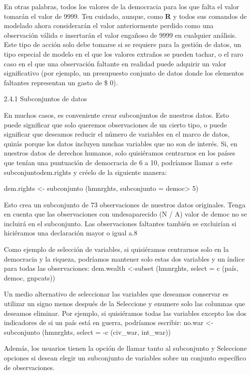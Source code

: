 \documentclass[
]{book}
\begin{document}
En otras palabras, todos los valores de la democracia para los que falta el valor tomarán el valor de 9999. Ten cuidado, aunque, como \textbf{R} y todos sus comandos de modelado ahora considerarán el valor anteriormente perdido como una observación válida e insertarán el valor engañoso de 9999 en cualquier análisis. Este tipo de acción solo debe tomarse si se requiere para la gestión de datos, un tipo especial de modelo en el que los valores extraños se pueden tachar, o el raro caso en el que una observación faltante en realidad puede adquirir un valor significativo (por ejemplo, un presupuesto conjunto de datos donde los elementos faltantes representan un gasto de \$ 0).

2.4.1 Subconjuntos de datos

En muchos casos, es conveniente crear subconjuntos de nuestros datos. Esto puede significar que solo queremos observaciones de un cierto tipo, o puede significar que deseamos reducir el número de variables en el marco de datos, quizás porque los datos incluyen muchas variables que no son de interés. Si, en nuestros datos de derechos humanos, solo quisiéramos centrarnos en los países que tenían una puntuación de democracia de 6 a 10, podríamos llamar a este subconjuntodem.rights y créelo de la siguiente manera:

dem.rights \textless- subconjunto (hmnrghts, subconjunto = democ\textgreater{} 5)

Esto crea un subconjunto de 73 observaciones de nuestros datos originales. Tenga en cuenta que las observaciones con undesaparecido (N / A) valor de democ no se incluirá en el subconjunto. Las observaciones faltantes también se excluirían si hiciéramos una declaración mayor o igual a.8

Como ejemplo de selección de variables, si quisiéramos centrarnos solo en la democracia y la riqueza, podríamos mantener solo estas dos variables y un índice para todas las observaciones:
dem.wealth \textless-subset (hmnrghts, select = c (país, democ, gnpcats))

Un medio alternativo de seleccionar las variables que deseamos conservar es utilizar un signo menos después de la Seleccione y enumere solo las columnas que deseamos eliminar. Por ejemplo, si quisiéramos todas las variables excepto los dos indicadores de si un país está en guerra, podríamos escribir:
no.war \textless- subconjunto (hmnrghts, select = -c (civ\_war, int\_war))

Además, los usuarios tienen la opción de llamar tanto al subconjunto y Seleccione opciones si desean elegir un subconjunto de variables sobre un conjunto específico de observaciones.
\end{document}
